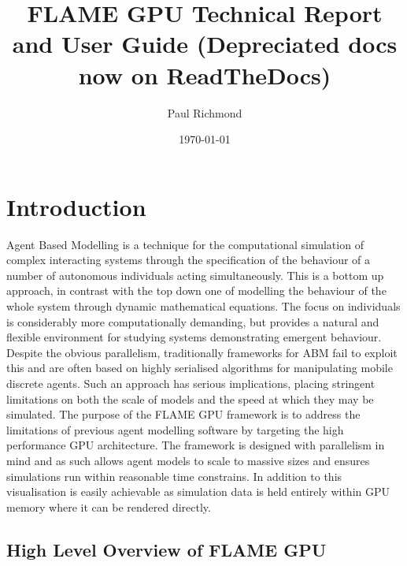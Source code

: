 \documentclass[11pt, a4paper, onecolumn, oneside]{report}
\title{FLAME GPU Technical Report and User Guide (Depreciated docs now on ReadTheDocs)}
\author{Paul Richmond}
\date{\today}
\begin{document}
\maketitle

\tableofcontents

\chapter{Introduction}
\label{ch:1}
Agent Based Modelling is a technique for the computational simulation of complex interacting systems through the specification of the behaviour of a number of autonomous individuals acting simultaneously.
This is a bottom up approach, in contrast with the top down one of modelling the behaviour of the whole system through dynamic mathematical equations. The focus on individuals is considerably more computationally demanding, but provides a natural and flexible environment for studying systems demonstrating emergent behaviour.
Despite the obvious parallelism, traditionally frameworks for ABM fail to exploit this and are often based on highly serialised algorithms for manipulating mobile discrete agents.
Such an approach has serious implications, placing stringent limitations on both the scale of models and the speed at which they may be simulated.
The purpose of the FLAME GPU framework is to address the limitations of previous agent modelling software by targeting the high performance GPU architecture.
The framework is designed with parallelism in mind and as such allows agent models to scale to massive sizes and ensures simulations run within reasonable time constrains.
In addition to this visualisation is easily achievable as simulation data is held entirely within GPU memory where it can be rendered directly.



\section{High Level Overview of FLAME GPU}
\label{sec:11}
\end{document}
